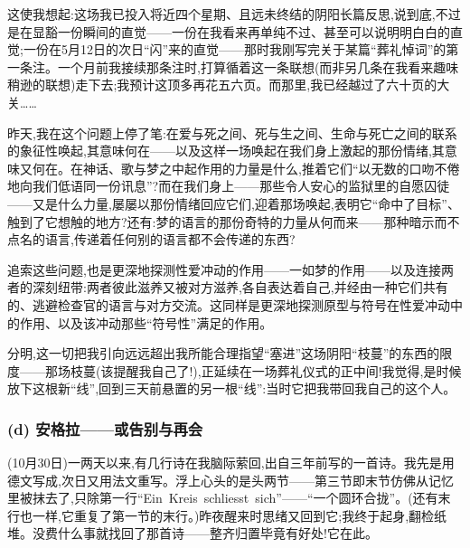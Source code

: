 这使我想起:这场我已投入将近四个星期、且远未终结的阴阳长篇反思,说到底,不过是在显豁一份瞬间的直觉——一份在我看来再单纯不过、甚至可以说明明白白的直觉;一份在5月12日的次日“闪”来的直觉——那时我刚写完关于某篇“葬礼悼词”的第一条注。一个月前我接续那条注时,打算循着这一条联想(而非另几条在我看来趣味稍逊的联想)走下去;\dmark{}我预计这顶多再花五六页。而那里,我已经越过了六十页的大关……

昨天,我在这个问题上停了笔:在爱与死之间、死与生之间、生命与死亡之间的联系的象征性唤起,其意味何在——以及这样一场唤起在我们身上激起的那份情绪,其意味又何在。在神话、歌与梦之中起作用的力量是什么,推着它们“以无数的口吻不倦地向我们低语同一份讯息”?而在我们身上——那些令人安心的监狱里的自愿囚徒——又是什么力量,屡屡以那份情绪回应它们,迎着那场唤起,表明它“命中了目标”、触到了它想触的地方?还有:梦的语言的那份奇特的力量从何而来——那种暗示而不点名的语言,传递着任何别的语言都不会传递的东西?

追索这些问题,也是更深地探测性爱冲动的作用——一如梦的作用——以及连接两者的深刻纽带:两者彼此滋养又被对方滋养,各自表达着自己,并经由一种它们共有的、逃避检查官的语言与对方交流。这同样是更深地探测原型与符号在性爱冲动中的作用、以及该冲动那些“符号性”满足的作用。

分明,这一切把我引向远远超出我所能合理指望“塞进”这场阴阳“枝蔓”的东西的限度——那场枝蔓(该提醒我自己了!),正延续在一场葬礼仪式的正中间!我觉得,是时候放下这根新“线”,回到三天前悬置的另一根“线”:当时它把我带回我自己的这个人。

\subsubsection*{(d) 安格拉——或告别与再会}
\label{ch18:local:h20}

\label{ch18:local:n18}

\dmark{}(10月30日)一两天以来,有几行诗在我脑际萦回,出自三年前写的一首诗。我先是用德文写成,次日又用法文重写。浮上心头的是头两节——第三节即末节仿佛从记忆里被抹去了,只除第一行“Ein~Kreis~schliesst~sich”——“一个圆环合拢”。(还有末行也一样,它重复了第一节的末行。)昨夜醒来时思绪又回到它;我终于起身,翻检纸堆。没费什么事就找回了那首诗——整齐归置毕竟有好处!它在此。

